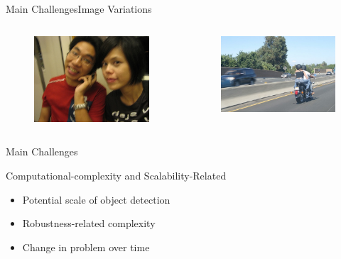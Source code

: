 \begin{frame}{Main Challenges}{Image Variations}
\begin{columns}
        \begin{figure}
            \includegraphics[width=0.7 \textwidth]{figs/000323.jpg}
        \end{figure}
        \begin{figure}
            \includegraphics[width=0.7 \textwidth]{figs/000579.jpg}
        \end{figure}

    \end{columns}
\end{frame}

\begin{frame}{Main Challenges}{}
        \begin{block}{Computational-complexity and Scalability-Related}
        \begin{itemize}
            \item Potential scale of object detection
            \item Robustness-related complexity
            \item Change in problem over time
        \end{itemize}
            

        \end{block}
\end{frame}
